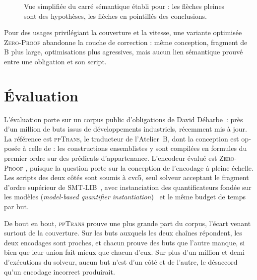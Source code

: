 \begin{otherlanguage}{french}
\begin{figure}[t]
  \centering
  \caption{Vue simplifiée du carré sémantique établi pour \beer{}: les
    flèches pleines sont des hypothèses, les flèches en pointillés des
    conclusions.}
  \label{fig:resume-square}
\end{figure}

Pour des usages privilégiant la couverture et la vitesse, une variante optimisée
\textsc{Zero-Proof} \beer{} abandonne la couche de correction : même conception,
fragment de B plus large, optimisations plus agressives, mais aucun lien
sémantique prouvé entre une obligation et son script.

\section*{Évaluation}

L'évaluation porte sur un corpus
public d'obligations de David Déharbe~\cite{deharbe2022pog}: près d'un
million de buts issus de développements industriels, récemment mis à jour.
La référence est \textsc{ppTrans}, le traducteur de l'Atelier~B, dont la conception est opposée à celle
de \beer{}: les constructions ensemblistes y sont compilées en formules du
premier ordre sur des prédicats d'appartenance. L'encodeur évalué est
\textsc{Zero-Proof} \beer{}, puisque la question porte sur la conception de
l'encodage à pleine échelle. Les scripts des deux côtés sont soumis à cvc5,
seul solveur acceptant le fragment d'ordre supérieur de
SMT-LIB~\cite{barbosa2019hosmt}, avec instanciation des quantificateurs fondée
sur les modèles (\emph{model-based quantifier
instantiation})~\cite{ge2009complete,kondylidou2025mbqi} et le même budget de
temps par but.

De bout en bout, \textsc{ppTrans} prouve une plus grande part du corpus, l'écart
venant surtout de la couverture.
Sur les buts auxquels les deux chaînes répondent, les deux encodages sont
proches, et chacun prouve des buts que l'autre manque, si bien que leur union
fait mieux que chacun d'eux. Sur plus d'un million et demi d'exécutions du
solveur, aucun but n'est  d'un côté et  de l'autre,
le désaccord qu'un encodage incorrect produirait.


\end{otherlanguage}
